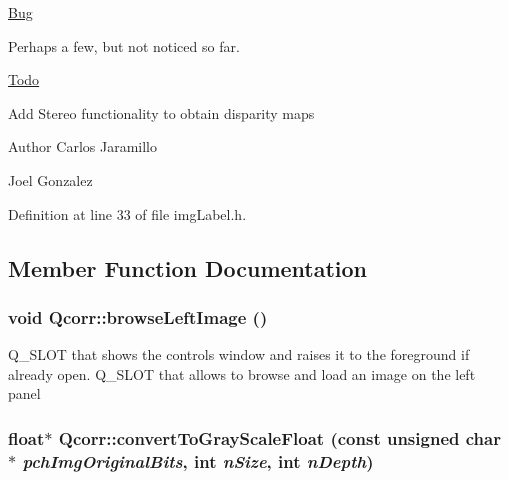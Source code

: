 \begin{Desc}
\item[\hyperlink{bug__bug000001}{Bug}]
\begin{DoxyItemize}
\item Perhaps a few, but not noticed so far.
\end{DoxyItemize}\end{Desc}
\begin{Desc}
\item[\hyperlink{todo__todo000001}{Todo}]
\begin{DoxyItemize}
\item Add Stereo functionality to obtain disparity maps
\end{DoxyItemize}\end{Desc}
\begin{DoxyAuthor}{Author}
Carlos Jaramillo 

Joel Gonzalez 
\end{DoxyAuthor}


Definition at line 33 of file imgLabel.h.

\subsection{Member Function Documentation}
\hypertarget{classQcorr_adb32e7bfe6afb84f306a9eb5bcd9b322}{
\subsubsection[{browseLeftImage}]{\setlength{\rightskip}{0pt plus 5cm}void Qcorr::browseLeftImage ()}}
\label{classQcorr_adb32e7bfe6afb84f306a9eb5bcd9b322}


Q\_\-SLOT that shows the controls window and raises it to the foreground if already open. Q\_\-SLOT that allows to browse and load an image on the left panel \hypertarget{classQcorr_a0f203c8a83cd1e6b503aee0a4c873402}{
\subsubsection[{convertToGrayScaleFloat}]{\setlength{\rightskip}{0pt plus 5cm}float$\ast$ Qcorr::convertToGrayScaleFloat (const unsigned char $\ast$ {\em pchImgOriginalBits}, \/  int {\em nSize}, \/  int {\em nDepth})}}
\label{classQcorr_a0f203c8a83cd1e6b503aee0a4c873402}


